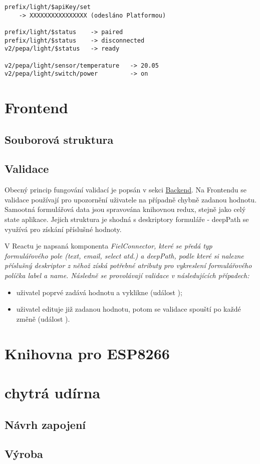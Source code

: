 \begin{verbatim}
prefix/light/$apiKey/set
    -> XXXXXXXXXXXXXXXX (odesláno Platformou)

prefix/light/$status    -> paired
prefix/light/$status    -> disconnected
v2/pepa/light/$status   -> ready

v2/pepa/light/sensor/temperature   -> 20.05
v2/pepa/light/switch/power         -> on
\end{verbatim}

\section{Frontend}

\subsection{Souborová struktura}

\subsection{Validace}
Obecný princip fungování validací je popsán v sekci \hyperref[BE:Validace]{Backend}. Na Frontendu se validace používají pro upozornění uživatele na případně chybně zadanou hodnotu. Samootná formulářová data jsou spravována knihovnou redux, stejně jako celý state aplikace. Jejich struktura je shodná s deskriptory formuláře - deepPath se využívá pro získání příslušné hodnoty.

V Reactu je napsaná komponenta \itshape{FielConnector}, které se předá typ formulářového pole (text, email, select atd.) a deepPath, podle které si nalezne příslušný deskriptor z něhož získá potřebné atributy pro vykreslení formulářového políčka label a name. Následně se provolávají validace v následujících případech:
\begin{itemize}
    \item uživatel poprvé zadává hodnotu a vyklikne (událost );
    \item uživatel edituje již zadanou hodnotu, potom se validace spouští po každé změně (událost ).
\end{itemize}

\section{Knihovna pro ESP8266}

\section{chytrá udírna}

\subsection{Návrh zapojení}

\subsection{Výroba}